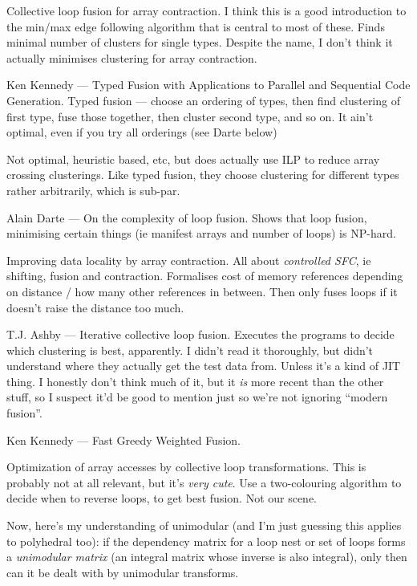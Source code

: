  Collective loop fusion for array contraction.
I think this is a good introduction to the min/max edge following algorithm that is central to most of these.
Finds minimal number of clusters for single types. Despite the name, I don't think it actually minimises clustering for array contraction.

 Ken Kennedy --- Typed Fusion with Applications to Parallel and Sequential Code Generation.
Typed fusion --- choose an ordering of types, then find clustering of first type, fuse those together, then cluster second type, and so on.
It ain't optimal, even if you try all orderings (see Darte below)

Not optimal, heuristic based, etc, but does actually use ILP to reduce array crossing clusterings.
Like typed fusion, they choose clustering for different types rather arbitrarily, which is sub-par.

 Alain Darte --- On the complexity of loop fusion.
Shows that loop fusion, minimising certain things (ie manifest arrays and number of loops) is NP-hard.

 Improving data locality by array contraction.
All about \emph{controlled SFC}, ie shifting, fusion and contraction.
Formalises cost of memory references depending on distance / how many other references in between. Then only fuses loops if it doesn't raise the distance too much.

 T.J. Ashby --- Iterative collective loop fusion.
Executes the programs to decide which clustering is best, apparently. I didn't read it thoroughly, but didn't understand where they actually get the test data from. Unless it's a kind of JIT thing.
I honestly don't think much of it, but it \emph{is} more recent than the other stuff, so I suspect it'd be good to mention just so we're not ignoring ``modern fusion''.

 Ken Kennedy --- Fast Greedy Weighted Fusion.


 Optimization of array accesses by collective loop transformations.
This is probably not at all relevant, but it's \emph{very cute}. Use a two-colouring algorithm to decide when to reverse loops, to get best fusion. Not our scene.


Now, here's my understanding of unimodular (and I'm just guessing this applies to polyhedral too):
if the dependency matrix for a loop nest or set of loops forms a \emph{unimodular matrix} (an integral matrix whose inverse is also integral), only then can it be dealt with by unimodular transforms.
